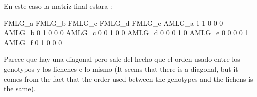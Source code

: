 En este caso la matriz final estara :

	FMLG_a	FMLG_b	FMLG_c	FMLG_d	FMLG_e
AMLG_a	1	1	0	0	0	
AMLG_b	0	1	0	0	0
AMLG_c	0	0	1	0	0
AMLG_d	0	0	0	1	0
AMLG_e	0	0	0	0	1
AMLG_f	0	1	0	0	0


Parece que hay una diagonal pero sale del hecho que el orden usado entre los genotypos y los lichenes e lo mismo (It seems that there is a diagonal, but it comes from the fact that the order used between the genotypes and the lichens is the same). 
